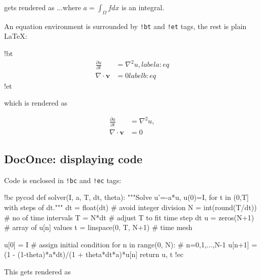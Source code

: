 \documentclass[%
oneside,                 %
final,                   %
10pt]{article}
\begin{document}
\eccq

gets rendered as ...where $a=\int_{\Omega}fdx$ is an integral.

An equation environment is surrounded by \Verb?!bt? and \Verb?!et? tags,
the rest is plain {\LaTeX}:










\bccq
!bt
\begin{align}
\frac{\partial u}{\partial t} &= \nabla^2 u,
label{a:eq}\\
\nabla\cdot\pmb{v} & = 0
label{b:eq}
\end{align}
!et

\eccq

which is rendered as

\begin{align}
\frac{\partial u}{\partial t} &= \nabla^2 u,
\label{_a:eq}\\
\nabla\cdot\pmb{v} & = 0
\label{_b:eq}
\end{align}

\subsection{DocOnce: displaying code}

Code is enclosed in \Verb?!bc? and \Verb?!ec? tags:
















\bccq
!bc pycod
def solver(I, a, T, dt, theta):
    """Solve u'=-a*u, u(0)=I, for t in (0,T] with steps of dt."""
    dt = float(dt)           # avoid integer division
    N = int(round(T/dt))     # no of time intervals
    T = N*dt                 # adjust T to fit time step dt
    u = zeros(N+1)           # array of u[n] values
    t = linspace(0, T, N+1)  # time mesh

    u[0] = I                 # assign initial condition
    for n in range(0, N):    # n=0,1,...,N-1
        u[n+1] = (1 - (1-theta)*a*dt)/(1 + theta*dt*a)*u[n]
    return u, t
!ec

\eccq

This gets rendered as
\end{document}
